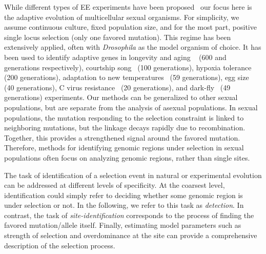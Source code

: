 \documentclass[11pt]{article}
\begin{document}
While different types of EE experiments have been
proposed~\cite{Barrick2013Genome,schlotterer2015combining} our focus
here is the adaptive evolution of multicellular sexual organisms. For
simplicity, we assume continuous culture, fixed population size, and
for the most part, positive single locus selection (only one favored
mutation). This regime has been extensively applied, often with
\emph{Drosophila} as the model organism of choice. It has been used to
identify adaptive genes in longevity and aging
~\cite{burke2010genome,remolina2012genomic} (600 and generations
respectively), courtship song~\cite{turner2011population} (100
generations), hypoxia tolerance~\cite{zhou2011experimental} (200
generations), adaptation to new
temperatures~\cite{orozco2012adaptation,tobler2014massive} (59
generations), egg size~\cite{jha2015whole} (40 generations), C virus
resistance~\cite{martins2014host} (20 generations), and
dark-fly~\cite{izutsu2015dynamics} (49 generations) experiments. Our
methods can be generalized to other sexual populations, but are
separate from the analysis of asexual populations. In sexual
populations, the mutation responding to the selection constraint is
linked to neighboring mutations, but the linkage decays rapidly due to
recombination. Together, this provides a strengthened signal around
the favored mutation. Therefore, methods for identifying genomic
regions under selection in sexual populations often focus on analyzing
genomic regions, rather than single sites.

The task of identification of a selection event in natural or
experimental evolution can be addressed at different levels of
specificity. At the coarsest level, identification could simply refer
to deciding whether some genomic region is under selection or not.  In
the following, we refer to this task as \emph{detection}. In contrast,
the task of \emph{site-identification} corresponds to the process of
finding the favored mutation/allele itself. Finally, estimating model
parameters such as strength of selection and overdominance at the site
can provide a comprehensive description of the selection process.
\end{document}
